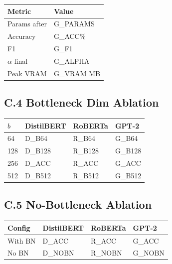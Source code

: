 \begin{table}[H]
\centering
\small
\begin{tabular}{ll}
\toprule
\textbf{Metric} & \textbf{Value} \\
\midrule
Params after & {{G\_PARAMS}} \\
Accuracy & {{G\_ACC}}\% \\
F1 & {{G\_F1}} \\
$\alpha$ final & {{G\_ALPHA}} \\
Peak VRAM & {{G\_VRAM}} MB \\
\bottomrule
\end{tabular}
\end{table}

\subsection{C.4 Bottleneck Dim Ablation}

\begin{table}[H]
\centering
\small
\begin{tabular}{llll}
\toprule
\textbf{$b$} & \textbf{DistilBERT} & \textbf{RoBERTa} & \textbf{GPT-2} \\
\midrule
64 & {{D\_B64}} & {{R\_B64}} & {{G\_B64}} \\
128 & {{D\_B128}} & {{R\_B128}} & {{G\_B128}} \\
256 & {{D\_ACC}} & {{R\_ACC}} & {{G\_ACC}} \\
512 & {{D\_B512}} & {{R\_B512}} & {{G\_B512}} \\
\bottomrule
\end{tabular}
\end{table}

\subsection{C.5 No-Bottleneck Ablation}

\begin{table}[H]
\centering
\small
\begin{tabular}{llll}
\toprule
\textbf{Config} & \textbf{DistilBERT} & \textbf{RoBERTa} & \textbf{GPT-2} \\
\midrule
With BN & {{D\_ACC}} & {{R\_ACC}} & {{G\_ACC}} \\
No BN & {{D\_NOBN}} & {{R\_NOBN}} & {{G\_NOBN}} \\
\bottomrule
\end{tabular}
\end{table}

